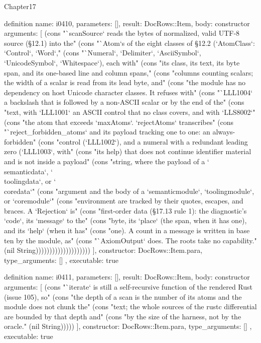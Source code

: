 \begin{lexlean}{Chapter17}
\begin{semanticmodule}
definition{
  name: i0410,
  parameters: [],
  result: DocRows::Item,
  body: constructor{
    arguments: [
      (cons "`scanSource` reads the bytes of normalized, valid UTF-8 source (§12.1) into the" (cons "`Atom`s of the eight classes of §12.2 (`AtomClass`: `Control`, `Word`," (cons "`Numeral`, `Delimiter`, `AsciiSymbol`, `UnicodeSymbol`, `Whitespace`), each with" (cons "its class, its text, its byte span, and its one-based line and column spans," (cons "columns counting scalars; the width of a scalar is read from its lead byte, and" (cons "the module has no dependency on host Unicode character classes. It refuses with" (cons "`LLL1004` a backslash that is followed by a non-ASCII scalar or by the end of the" (cons "text, with `LLL1001` an ASCII control that no class covers, and with `LLS8002`" (cons "the atom that exceeds `maxAtoms`. `rejectAtoms` transcribes" (cons "`reject_forbidden_atoms` and its payload tracking one to one: an always-forbidden" (cons "control (`LLL1002`), and a numeral with a redundant leading zero (`LLL1003`, with" (cons "its help) that does not continue identifier material and is not inside a payload" (cons "string, where the payload of a `\\semanticdata`, `\\toolingdata`, or `\\coredata`" (cons "argument and the body of a `semanticmodule`, `toolingmodule`, or `coremodule`" (cons "environment are tracked by their quotes, escapes, and braces. A `Rejection` is" (cons "first-order data (§17.13 rule 1): the diagnostic's `code`, its `message` to the" (cons "byte, its `place` (the span, when it has one), and its `help` (when it has" (cons "one). A count in a message is written in base ten by the module, as" (cons "`AxiomOutput` does. The roots take no capability." (nil String))))))))))))))))))))
    ],
    constructor: DocRows::Item.para,
    type_arguments: []
  },
  executable: true
}

definition{
  name: i0411,
  parameters: [],
  result: DocRows::Item,
  body: constructor{
    arguments: [
      (cons "`iterate` is still a self-recursive function of the rendered Rust (issue 105), so" (cons "the depth of a scan is the number of its atoms and the module does not chunk the" (cons "text; the whole sources of the rustc differential are bounded by that depth and" (cons "by the size of the harness, not by the oracle." (nil String)))))
    ],
    constructor: DocRows::Item.para,
    type_arguments: []
  },
  executable: true
}


\end{semanticmodule}
\end{lexlean}
